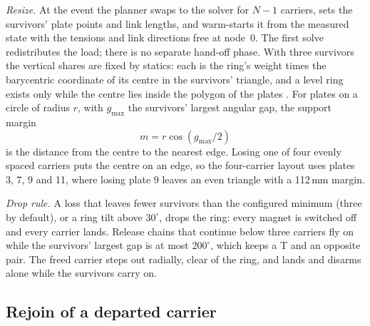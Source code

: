 \emph{Resize.} At the event the planner swaps to the solver for $N-1$ carriers, sets the survivors' plate points and
link lengths, and warm-starts it from the measured state with the tensions and link directions free at node~0. The
first solve redistributes the load; there is no separate hand-off phase. With three survivors the vertical shares
are fixed by statics: each is the ring's weight times the barycentric coordinate of its centre in the survivors'
triangle, and a level ring exists only while the centre lies inside the polygon of the plates
\cite{michael2011cooperative}. For plates on a circle of radius $r$, with $g_{\max}$ the survivors' largest angular
gap, the support margin
\begin{equation}
  m = r\cos(g_{\max}/2)
  \label{eq:margin}
\end{equation}
is the distance from the centre to the nearest edge. Losing one of four evenly spaced carriers puts the centre on an
edge, so the four-carrier layout uses plates 3, 7, 9 and 11, where losing plate 9 leaves an even triangle with a
112\,mm margin.

\emph{Drop rule.} A loss that leaves fewer survivors than the configured minimum (three by default), or a ring tilt
above $30^\circ$, drops the ring: every magnet is switched off and every carrier lands. Release chains that continue
below three carriers fly on while the survivors' largest gap is at most $200^\circ$, which keeps a T and an opposite
pair. The freed carrier steps out radially, clear of the ring, and lands and disarms alone while the survivors carry
on.

\subsection{Rejoin of a departed carrier}
\label{sec:rejoin}

